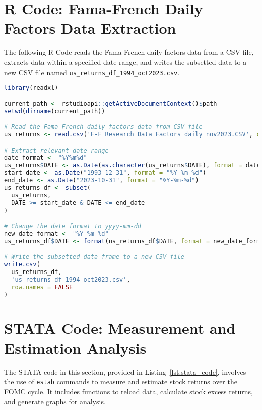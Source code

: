 



\section{R Code: Fama-French Daily Factors Data Extraction}
\label{app:r_code}

The following R Code reads the Fama-French daily factors data from a CSV file, extracts data within a specified date range, and writes the subsetted data to a new CSV file named \texttt{us\_returns\_df\_1994\_oct2023.csv}.

\begin{singlespace}

\begin{lstlisting}[language=R, caption={R Code for Fama-French Daily Factors Data Extraction}, label=lst:r_code]
library(readxl)

current_path <- rstudioapi::getActiveDocumentContext()$path
setwd(dirname(current_path))

# Read the Fama-French daily factors data from CSV file
us_returns <- read.csv('F-F_Research_Data_Factors_daily_nov2023.CSV', col.names = c("DATE", "Mkt-RF", "SMB", "HML", "RF"), skip = 4)

# Extract relevant date range
date_format <- "%Y%m%d"
us_returns$DATE <- as.Date(as.character(us_returns$DATE), format = date_format)
start_date <- as.Date("1993-12-31", format = "%Y-%m-%d")
end_date <- as.Date("2023-10-31", format = "%Y-%m-%d")
us_returns_df <- subset(
  us_returns,
  DATE >= start_date & DATE <= end_date
)

# Change the date format to yyyy-mm-dd
new_date_format <- "%Y-%m-%d"
us_returns_df$DATE <- format(us_returns_df$DATE, format = new_date_format)

# Write the subsetted data frame to a new CSV file
write.csv(
  us_returns_df,
  'us_returns_df_1994_oct2023.csv',
  row.names = FALSE
)
\end{lstlisting}
\end{singlespace}


\section{STATA Code: Measurement and Estimation Analysis}
\label{app:stata_code}

The STATA code in this section, provided in Listing~\ref{lst:stata_code}, involves the use of \texttt{estab} commands to measure and estimate stock returns over the FOMC cycle. It includes functions to reload data, calculate stock excess returns, and generate graphs for analysis.



